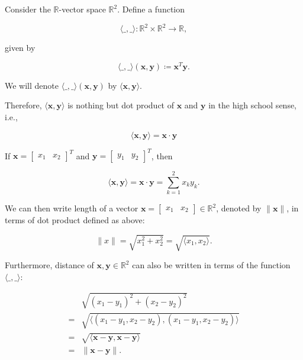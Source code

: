 \begin{example}
	Consider the \( \mathbb{R} \)-vector space \( \mathbb{R}^2 \). Define a function

	\begin{equation}
		\langle \_,\_ \rangle : \mathbb{R}^2 \times \mathbb{R}^2 \to \mathbb{R},
		\label{eq:motivating-example-1}
	\end{equation}

	given by

	\begin{equation}
		\langle \_,\_ \rangle(\mathbf{x}, \mathbf{y}) \coloneq \mathbf{x}^T \mathbf{y}.
		\label{eq:motivating-example-2}
	\end{equation}

	We will denote \( \langle \_, \_ \rangle (\mathbf{x}, \mathbf{y}) \) by \( \langle \mathbf{x}, \mathbf{y} \rangle \).

	Therefore, \( \langle \mathbf{x}, \mathbf{y} \rangle \) is nothing but dot product of \( \mathbf{x} \) and \( \mathbf{y} \) in the high school sense, i.e.,

	\begin{equation}
		\langle \mathbf{x}, \mathbf{y} \rangle = \mathbf{x} \cdot \mathbf{y}
		\label{eq:motivating-example-3}
	\end{equation}

	If \( \mathbf{x} = \begin{bmatrix} x_1 & x_2 \end{bmatrix}^T \) and \( \mathbf{y} = \begin{bmatrix} y_1 & y_2 \end{bmatrix}^T \), then

	\begin{equation}
		\langle \mathbf{x}, \mathbf{y} \rangle = \mathbf{x} \cdot \mathbf{y} = \sum_{k=1}^{2} x_k y_k.
		\label{eq:motivating-example-4}
	\end{equation}

	We can then write length of a vector \( \mathbf{x} = \begin{bmatrix} x_1 & x_2 \end{bmatrix}  \in \mathbb{R}^2 \), denoted by \( \|\mathbf{x}\| \), in terms of dot product defined as above:

	\begin{equation}
		\|x\| = \sqrt{x_1^2 + x_2^2} = \sqrt{\langle x_1, x_2 \rangle}.
		\label{eq:motivating-example-6}
	\end{equation}

	Furthermore, distance of \( \mathbf{x}, \mathbf{y} \in \mathbb{R}^2 \) can also be written in terms of the function \( \langle \_, \_ \rangle \):

	\begin{align}
		  & \sqrt{(x_1 - y_1)^2 + (x_2 - y_2)^2}                                    \\
		= & \sqrt{\langle (x_1-y_1, x_2-y_2), (x_1-y_1, x_2-y_2) \rangle}           \\
		= & \sqrt{\langle \mathbf{x} - \mathbf{y}, \mathbf{x} - \mathbf{y} \rangle} \\
		= & \|\mathbf{x} - \mathbf{y}\|
		.\end{align}
\end{example}

